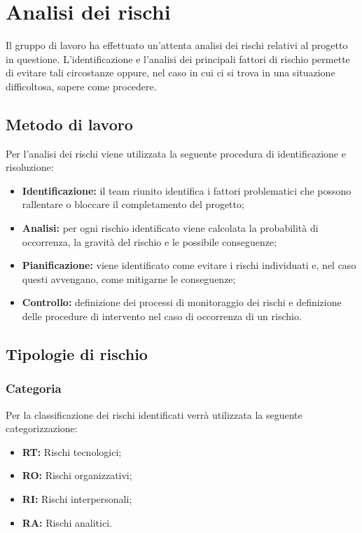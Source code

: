 \section{Analisi dei rischi}

Il gruppo di lavoro ha effettuato un'attenta analisi dei rischi relativi al progetto in questione. L'identificazione e l'analisi dei principali fattori di rischio permette di evitare tali circostanze oppure, nel caso in cui ci si trova in una situazione difficoltosa, sapere come procedere.

\subsection{Metodo di lavoro}
Per l'analisi dei rischi viene utilizzata la seguente procedura di identificazione e risoluzione:
\begin{itemize}
	\item \textbf{Identificazione:} il team riunito identifica i fattori problematici che possono rallentare o bloccare il completamento del progetto;
	\item \textbf{Analisi:} per ogni rischio identificato viene calcolata la probabilità di occorrenza, la gravità del rischio e le possibile conseguenze;
	\item \textbf{Pianificazione:} viene identificato come evitare i rischi individuati e, nel caso questi avvengano, come mitigarne le conseguenze;
	\item \textbf{Controllo:} definizione dei processi di monitoraggio dei rischi e definizione delle procedure di intervento nel caso di occorrenza di un rischio.
\end{itemize}
\subsection{Tipologie di rischio}
\subsubsection{Categoria}
Per la classificazione dei rischi identificati verrà utilizzata la seguente categorizzazione:
\begin{itemize}
	\item \textbf{RT:} Rischi tecnologici;
	\item \textbf{RO:} Rischi organizzativi;
	\item \textbf{RI:} Rischi interpersonali;
	\item \textbf{RA:} Rischi analitici.
\end{itemize}
